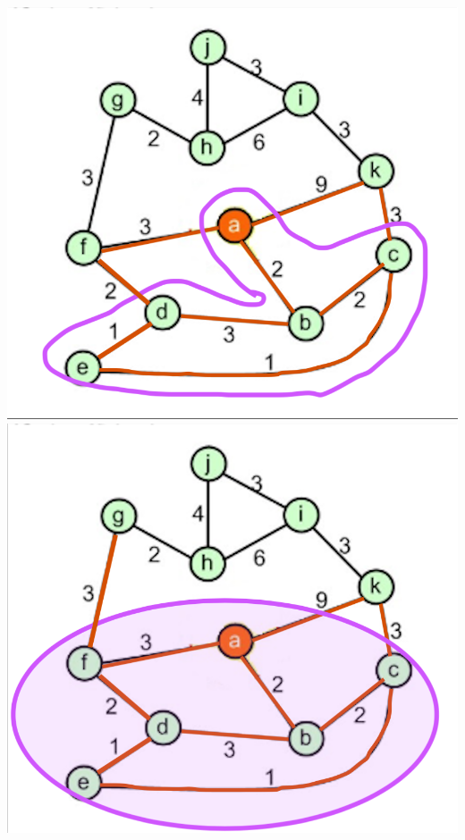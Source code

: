 \documentclass[a4paper]{exam}
\begin{document}
\begin{questions}
\begin{parts}
\begin{solution}
    \includegraphics[scale=0.2]{Q3/images3b/3b5}
    \includegraphics[scale=0.2]{Q3/images3b/3b6}

\end{solution}
\end{parts}
\end{questions}
\end{document}
